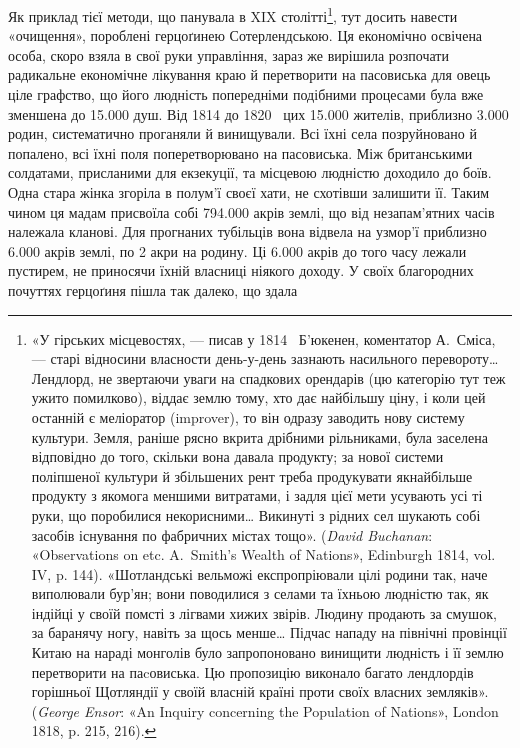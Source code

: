 Як приклад тієї методи, що панувала в XIX столітті\footnote{
«У гірських місцевостях, — писав у 1814~ Б’юкенен, коментатор
А.~Сміса, — старі відносини власности день-у-день зазнають насильного
перевороту\dots{} Лендлорд, не звертаючи уваги на спадкових орендарів
(цю категорію тут теж ужито помилково), віддає землю тому, хто дає найбільшу
ціну, і коли цей останній є меліоратор (improver), то він одразу заводить
нову систему культури. Земля, раніше рясно вкрита дрібними рільниками,
була заселена відповідно до того, скільки вона давала продукту;
за нової системи поліпшеної культури й збільшених рент треба продукувати
якнайбільше продукту з якомога меншими витратами, і задля цієї
мети усувають усі ті руки, що поробилися некорисними\dots{} Викинуті з
рідних сел шукають собі засобів існування по фабричних містах тощо».
(\emph{David Buchanan}: «Observations on etc. A.~Smith’s Wealth of Nations»,
Edinburgh 1814, vol. IV, p. 144). «Шотландські вельможі експропріювали
цілі родини так, наче виполювали бур’ян; вони поводилися з селами
та їхньою людністю так, як індійці у своїй помсті з лігвами хижих звірів.
Людину продають за смушок, за баранячу ногу, навіть за щось
менше\dots{} Підчас нападу на північні провінції Китаю на нараді монголів
було запропоновано винищити людність і її землю перетворити на паcовиська.
Цю пропозицію виконало багато лендлордів горішньої Щотляндії
у своїй власній країні проти своїх власних земляків». (\emph{George
Ensor}: «An Inquiry concerning the Population of Nations», London 1818,
p. 215, 216).
}, тут досить
навести «очищення», пороблені герцоґинею Сотерлендською.
Ця економічно освічена особа, скоро взяла в свої руки управління,
зараз же вирішила розпочати радикальне економічне лікування
краю й перетворити на пасовиська для овець ціле графство,
що його людність попередніми подібними процесами була
вже зменшена до \num{15.000} душ. Від 1814 до 1820~ цих \num{15.000} жителів,
приблизно \num{3.000} родин, систематично проганяли й винищували.
Всі їхні села позруйновано й попалено, всі їхні поля
поперетворювано на пасовиська. Між британськими солдатами,
присланими для екзекуції, та місцевою людністю доходило до
боїв. Одна стара жінка згоріла в полум’ї своєї хати, не схотівши
залишити її. Таким чином ця мадам присвоїла собі \num{794.000} акрів
землі, що від незапам’ятних часів належала кланові. Для прогнаних
тубільців вона відвела на узмор’ї приблизно \num{6.000} акрів
землі, по 2 акри на родину. Ці \num{6.000} акрів до того часу лежали
пустирем, не приносячи їхній власниці ніякого доходу. У своїх
благородних почуттях герцоґиня пішла так далеко, що здала
